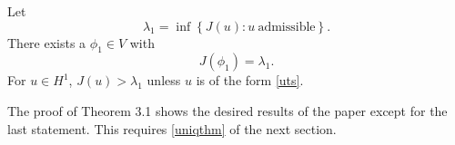 \begin{theorem}%
Let
    $$\lambda_1 = \inf\left\{J(u): u~\text{admissible}\right\}.$$
    There exists a $\phi_1\in V$ %
    with 
    $$J(\phi_1)=\lambda_1.$$ 
    For $u\in H^1$, $J(u)>\lambda_1$ unless $u$ is of the form \eqref{uts}.
\end{theorem}

The proof of Theorem 3.1 shows the desired results of the paper except for the
last statement. This requires \ref{uniqthm} of the next section.
